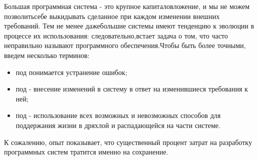 \documentclass[10pt]{article}
\begin{document}
Большая программная система - это крупное капиталовложение, и мы не можем позволить\linebreak  себе выкидывать сделанное при каждом изменении внешних требований. Тем не менее даже\linebreak  большие системы имеют тенденцию к эволюции в процессе их использования: следовательно,\linebreak  встает задача о том, что часто неправильно называют { программного обеспечения}.\linebreak  Чтобы быть более точными, введем несколько терминов: 
\begin{itemize}
\item \hspace{0.5cm} под {} понимается устранение ошибок;
\item \hspace{0.5cm} под {} - внесение изменений в систему в ответ на изменившиеся требования к ней;
\item \hspace{0.5cm} под {} - использование всех возможных и невозможных способов для поддержания жизни в дряхлой и распадающейся на части системе.
\end{itemize}

К сожалению, опыт показывает, что существенный процент затрат на разработку программных систем тратится именно на сохранение. \vspace{3mm}
\end{document}
